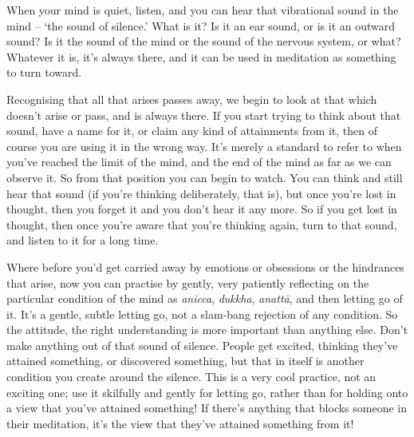 
When your mind is quiet, listen, and you can hear that vibrational sound in the mind -- `the sound of silence.' What is it? Is it an ear sound, or is it an outward sound? Is it the sound of the mind or the sound of the nervous system, or what? Whatever it is, it's always there, and it can be used in meditation as something to turn toward.

Recognising that all that arises passes away, we begin to look at that which doesn't arise or pass, and is always there. If you start trying to think about that sound, have a name for it, or claim any kind of attainments from it, then of course you are using it in the wrong way. It's merely a standard to refer to when you've reached the limit of the mind, and the end of the mind as far as we can observe it. So from that position you can begin to watch. You can think and still hear that sound (if you're thinking deliberately, that is), but once you're lost in thought, then you forget it and you don't hear it any more. So if you get lost in thought, then once you're aware that you're thinking again, turn to that sound, and listen to it for a long time.

Where before you'd get carried away by emotions or obsessions or the hindrances that arise, now you can practise by gently, very patiently reflecting on the particular condition of the mind as \textit{anicca}, \textit{dukkha}, \textit{anattā}, and then letting go of it. It's a gentle, subtle letting go, not a slam-bang rejection of any condition. So the attitude, the right understanding is more important than anything else. Don't make anything out of that sound of silence. People get excited, thinking they've attained something, or discovered something, but that in itself is another condition you create around the silence. This is a very cool practice, not an exciting one; use it skilfully and gently for letting go, rather than for holding onto a view that you've attained something! If there's anything that blocks someone in their meditation, it's the view that they've attained something from it!

